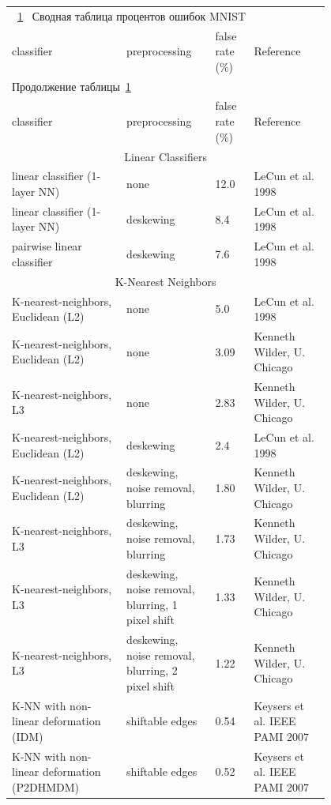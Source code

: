 \documentclass[utf8,usehyperref,14pt]{G7-32}
\begin{document}
\newpage
\appendix
{}
\label{MNISTABLE}
\begin{longtable}{p{0.3\linewidth}|p{0.2\linewidth}|p{0.1\linewidth}|p{0.2\linewidth}}
\multicolumn{4}{l}{\tablename~\ref{meer} ~Сводная таблица процентов ошибок MNIST \label{meer}}\\

classifier & preprocessing &  false rate (\%) &  Reference \\

\endfirsthead
\multicolumn{4}{l}{Продолжение таблицы~\ref{meer}}\\

classifier & preprocessing &  false rate (\%) &  Reference \\

\endhead
\multicolumn{4}{c}{Linear Classifiers} \\ \hline
linear classifier (1-layer NN) & none & 12.0 & LeCun et al. 1998 \\ 
linear classifier (1-layer NN) & deskewing & 8.4 & LeCun et al. 1998 \\
pairwise linear classifier & deskewing & 7.6 & LeCun et al. 1998  \\ 
\multicolumn{4}{c}{K-Nearest Neighbors } \\ \hline
K-nearest-neighbors, Euclidean (L2) & none & 5.0 & LeCun et al. 1998  \\ 
K-nearest-neighbors, Euclidean (L2) & none & 3.09 & Kenneth Wilder, U. Chicago  \\ 
K-nearest-neighbors, L3 & none & 2.83 & Kenneth Wilder, U. Chicago  \\ 
K-nearest-neighbors, Euclidean (L2) & deskewing & 2.4 & LeCun et al. 1998  \\ 
K-nearest-neighbors, Euclidean (L2) & deskewing, noise removal, blurring & 1.80 & Kenneth Wilder, U. Chicago  \\
K-nearest-neighbors, L3 & deskewing, noise removal, blurring & 1.73 & Kenneth Wilder, U. Chicago  \\
K-nearest-neighbors, L3 & deskewing, noise removal, blurring, 1 pixel shift & 1.33 & Kenneth Wilder, U. Chicago  \\ 
K-nearest-neighbors, L3 & deskewing, noise removal, blurring, 2 pixel shift & 1.22 & Kenneth Wilder, U. Chicago  \\ 
K-NN with non-linear deformation (IDM) & shiftable edges & 0.54 & Keysers et al. IEEE PAMI 2007  \\ 
K-NN with non-linear deformation (P2DHMDM) & shiftable edges & 0.52 & Keysers et al. IEEE PAMI 2007  \\ 

\end{longtable}
\end{document}
